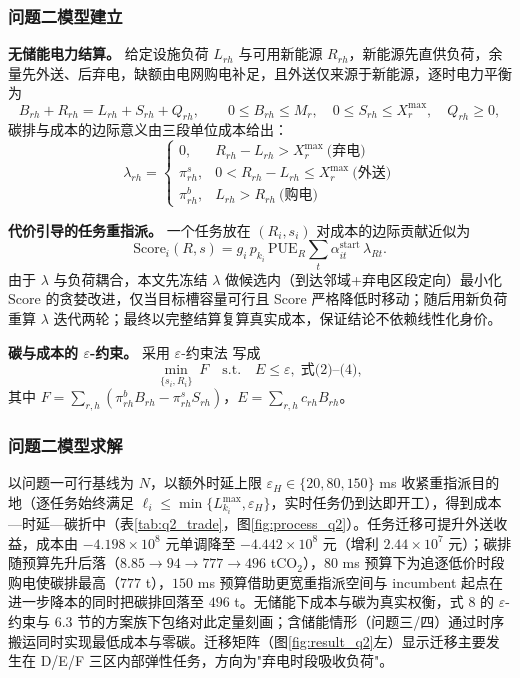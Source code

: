\subsubsection{问题二模型建立}

\noindent\textbf{无储能电力结算。} 给定设施负荷 $L_{rh}$ 与可用新能源 $R_{rh}$，新能源先直供负荷，余量先外送、后弃电，缺额由电网购电补足，且外送仅来源于新能源，逐时电力平衡为
\begin{equation}
B_{rh}+R_{rh}=L_{rh}+S_{rh}+Q_{rh},\qquad 0\le B_{rh}\le M_r,\quad 0\le S_{rh}\le X_r^{\max},\quad Q_{rh}\ge 0,
\end{equation}
碳排与成本的边际意义由三段单位成本给出：
\begin{equation}
\lambda_{rh}=\begin{cases}0,&R_{rh}-L_{rh}>X_r^{\max}\ \text{(弃电)}\\
\pi_{rh}^s,&0<R_{rh}-L_{rh}\le X_r^{\max}\ \text{(外送)}\\
\pi_{rh}^b,&L_{rh}>R_{rh}\ \text{(购电)}\end{cases}
\end{equation}

\noindent\textbf{代价引导的任务重指派。} 一个任务放在 $(R_i,s_i)$ 对成本的边际贡献近似为
\begin{equation}
\mathrm{Score}_i(R,s)=g_i\,p_{k_i}\,\mathrm{PUE}_R\sum_t \alpha_{i t}^{\mathrm{start}}\,\lambda_{R t}.
\end{equation}
由于 $\lambda$ 与负荷耦合，本文先冻结 $\lambda$ 做候选内（到达邻域+弃电区段定向）最小化 $\mathrm{Score}$ 的贪婪改进，仅当目标槽容量可行且 Score 严格降低时移动；随后用新负荷重算 $\lambda$ 迭代两轮；最终以完整结算复算真实成本，保证结论不依赖线性化身价。

\noindent\textbf{碳与成本的 $\varepsilon$-约束。} 采用 $\varepsilon$-约束法\cite{mavrotas2009eps} 写成
\begin{equation}
\min_{\{s_i,R_i\}}\ F\quad\text{s.t.}\quad E\le \varepsilon,\;\text{式(2)--(4)},
\end{equation}
其中 $F=\sum_{r,h}(\pi_{rh}^b B_{rh}-\pi_{rh}^s S_{rh})$，$E=\sum_{r,h}c_{rh}B_{rh}$。

\subsubsection{问题二模型求解}

以问题一可行基线为 $N$，以额外时延上限 $\varepsilon_H\in\{20,80,150\}$ ms 收紧重指派目的地（逐任务始终满足 $\ell_i\le\min\{L_{k_i}^{\max},\varepsilon_H\}$，实时任务仍到达即开工），得到成本—时延—碳折中（表\ref{tab:q2_trade}，图\ref{fig:process_q2}）。任务迁移可提升外送收益，成本由 $-4.198\times10^8$ 元单调降至 $-4.442\times10^8$ 元（增利 $2.44\times10^7$ 元）；碳排随预算先升后落（$8.85\to94\to777\to496$ tCO$_2$），$80$ ms 预算下为追逐低价时段购电使碳排最高（$777$ t），$150$ ms 预算借助更宽重指派空间与 incumbent 起点在进一步降本的同时把碳排回落至 $496$ t。无储能下成本与碳为真实权衡，式 8 的 $\varepsilon$-约束与 6.3 节的方案族下包络对此定量刻画；含储能情形（问题三/四）通过时序搬运同时实现最低成本与零碳。迁移矩阵（图\ref{fig:result_q2}左）显示迁移主要发生在 D/E/F 三区内部弹性任务，方向为"弃电时段吸收负荷"。

